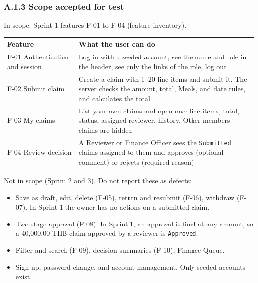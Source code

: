 \subsubsection*{A.1.3 Scope accepted for test}\label{A:scope}

In scope: Sprint 1 features F-01 to F-04 (feature inventory).

{\def\LTcaptype{none} %
\begin{longtable}[]{@{}
  >{\raggedright\arraybackslash}p{}
  >{\raggedright\arraybackslash}p{}@{}}
\toprule\noalign{}
\begin{minipage}[b]{\linewidth}\raggedright
Feature
\end{minipage} & \begin{minipage}[b]{\linewidth}\raggedright
What the user can do
\end{minipage} \\
\midrule\noalign{}
\endhead
\bottomrule\noalign{}
\endlastfoot
F-01 Authentication and session & Log in with a seeded account, see the name and role in the header, see only the links of the role, log out \\
F-02 Submit claim & Create a claim with 1--20 line items and submit it. The server checks the amount, total, Meals, and date rules, and calculates the total \\
F-03 My claims & List your own claims and open one: line items, total, status, assigned reviewer, history. Other members\textquotesingle{} claims are hidden \\
F-04 Review decision & A Reviewer or Finance Officer sees the \texttt{Submitted} claims assigned to them and approves (optional comment) or rejects (required reason) \\
\end{longtable}
}

Not in scope (Sprint 2 and 3). Do not report these as defects:

\begin{itemize}
\tightlist
\item
  Save as draft, edit, delete (F-05), return and resubmit (F-06), withdraw (F-07). In Sprint 1 the owner has no actions on a submitted claim.
\item
  Two-stage approval (F-08). In Sprint 1, an approval is final at any amount, so a 40,000.00 THB claim approved by a reviewer is \texttt{Approved}.
\item
  Filter and search (F-09), decision summaries (F-10), Finance Queue.
\item
  Sign-up, password change, and account management. Only seeded accounts exist.
\end{itemize}

